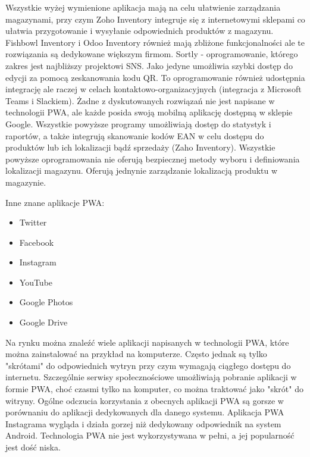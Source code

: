\documentclass[../main.tex]{subfiles}
\begin{document}
Wszystkie wyżej wymienione aplikacja mają na celu ułatwienie zarządzania magazynami, przy czym Zoho Inventory integruje się z internetowymi sklepami co ułatwia przygotowanie i wysyłanie odpowiednich produktów z magazynu. Fishbowl Inventory i Odoo Inventory również mają zbliżone funkcjonalności ale te rozwiązania są dedykowane większym firmom. Sortly - oprogramowanie, którego zakres jest najbliższy projektowi SNS. Jako jedyne umożliwia szybki dostęp do edycji za pomocą zeskanowania kodu QR. To oprogramowanie również udostępnia integrację ale raczej w celach kontaktowo-organizacyjnych (integracja z Microsoft Teams i Slackiem). Żadne z dyskutowanych rozwiązań nie jest napisane w technologii PWA, ale każde posida swoją mobilną aplikację dostępną w sklepie Google. Wszystkie powyższe programy umożliwiają dostęp do statystyk i raportów, a także integrują skanowanie kodów EAN w celu dostępu do produktów lub ich lokalizacji bądź sprzedaży (Zaho Inventory). Wszystkie powyższe oprogramowania nie oferują bezpiecznej metody wyboru i definiowania lokalizacji magazynu. Oferują jednynie zarządzanie lokalizacją produktu w magazynie. %

Inne znane aplikacje PWA:
\begin{itemize}
    \item Twitter
    \item Facebook
    \item Instagram
    \item YouTube
    \item Google Photos
    \item Google Drive
\end{itemize}

Na rynku można znaleźć wiele aplikacji napisanych w technologii PWA, które można zainstalować na przykład na komputerze. Często jednak są tylko "skrótami" do odpowiednich wytryn przy czym wymagają ciągłego dostępu do internetu. Szczególnie serwisy społecznościowe umożliwiają pobranie aplikacji w formie PWA, choć czasmi tylko na komputer, co można traktować jako  "skrót" do witryny. Ogólne odczucia korzystania z obecnych aplikacji PWA są gorsze w porównaniu do aplikacji dedykowanych dla danego systemu. Aplikacja PWA Instagrama wygląda i działa gorzej niż dedykowany odpowiednik na system Android. Technologia PWA nie jest wykorzystywana w pełni, a jej popularność jest dość niska.
\end{document}
